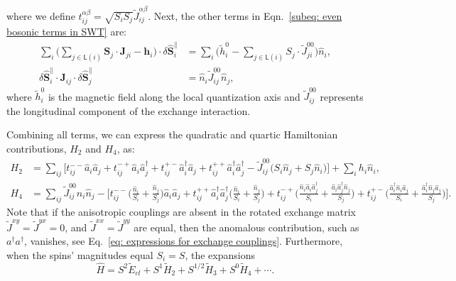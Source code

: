 \documentclass[aps, prx, nofootinbib, superscriptaddress]{revtex4-2}
\begin{document}
where we define $t^{\alpha\beta}_{ij} = \sqrt{S_{i}S_{j}} \widetilde{J}^{\alpha\beta}_{ij}$.
Next, the other terms in Eqn.~\eqref{subeq: even bosonic terms in SWT} are:
\begin{equation}
    \begin{split}
    \sum_{i} \Big( \sum_{j \in \mathsf{L}(i)} \mathbf{S}_{j} \cdot \mathbf{J}_{ji} - \mathbf{h}_{i} \Big) \cdot \delta \hat{\mathbf{S}}_{i}^{\parallel} 
    &= 
    \sum_{i} \Big( \widetilde{h}_{i}^{0} - \sum_{j \in \mathsf{L}(i)} S_{j} \cdot \widetilde{J}_{ji}^{00} \Big)  \hat{n}_{i}, \\
    \delta \hat{\mathbf{S}}_{i}^{\parallel} \cdot \mathbf{J}_{ij} \cdot \delta \hat{\mathbf{S}}_{j}^{\parallel}
    &= \hat{n}_{i} \widetilde{J}_{ij}^{00} \hat{n}_{j},
    \end{split}
\end{equation}
where $\widetilde{h}_{i}^{0}$ is the magnetic field along the local quantization axis and $\widetilde{J}_{ij}^{00}$ represents the longitudinal component of the exchange interaction.

Combining all terms, we can express the quadratic and quartic Hamiltonian contributions, $H_{2}$ and $H_{4}$, as:
\begin{align}
    H_{2} &= \sum_{ij} \Big[ t_{ij}^{--} \hat{a}_{i} \hat{a}_{j} + t_{ij}^{-+} \hat{a}_{i}\hat{a}_{j}^{\dagger} + t_{ij}^{+-} \hat{a}_{i}^{\dagger} \hat{a}_{j} + t_{ij}^{++} \hat{a}^{\dagger}_{i} \hat{a}^{\dagger}_{j} - \widetilde{J}_{ij}^{00} \big( S_{i} \hat{n}_{j} + S_{j} \hat{n}_{i} \big) \Big] + \sum_{i} h_{i} \hat{n}_{i}, 
    \label{eq: SWT bosonic H2 in real space}\\
    H_{4} &= \sum_{ij} \widetilde{J}_{ij}^{00} \hat{n}_{i} \hat{n}_{j} - \Big[ t_{ij}^{--} \big( \tfrac{\hat{n}_{i}}{S_{i}} + \tfrac{\hat{n}_{j}}{S_{j}} \big) \hat{a}_{i} \hat{a}_{j} + t_{ij}^{++} \hat{a}^{\dagger}_{i} \hat{a}^{\dagger}_{j} \big( \tfrac{\hat{n}_{i}}{S_{i}} + \tfrac{\hat{n}_{j}}{S_{j}} \big) + t_{ij}^{-+} \big( \tfrac{\hat{n}_{i} \hat{a}_{i} \hat{a}_{j}^{\dagger}}{S_{i}} + \tfrac{\hat{a}_{i} \hat{a}_{j}^{\dagger} \hat{n}_{j}}{S_{j}} \big) + t_{ij}^{+-} \big( \tfrac{\hat{a}_{i}^{\dagger} \hat{n}_{i} \hat{a}_{j}}{S_{i}} + \tfrac{\hat{a}_{i}^{\dagger} \hat{n}_{j} \hat{a}_{j}}{S_{j}} \big) \Big]. 
    \label{eq: SWT bosonic H4 in real space}
\end{align}
Note that if the anisotropic couplings are absent in the rotated exchange matrix $\widetilde{J}^{xy} = \widetilde{J}^{yx} = 0$, and $\widetilde{J}^{xx} = \widetilde{J}^{yy}$ are equal, then the anomalous contribution, such as $a^{\dagger}a^{\dagger}$, vanishes, see Eq.~\eqref{eq: expressions for exchange couplings}. 
Furthermore, when the spins' magnitudes equal $S_{i} = S$, the expansions 
\begin{equation}
    \hat{H} = S^{2} \tilde{E}_{cl} + S^{1} \tilde{H}_2 + S^{1/2} \tilde{H}_3 + S^{0} \tilde{H}_4 + \cdots.
\end{equation}
\end{document}
